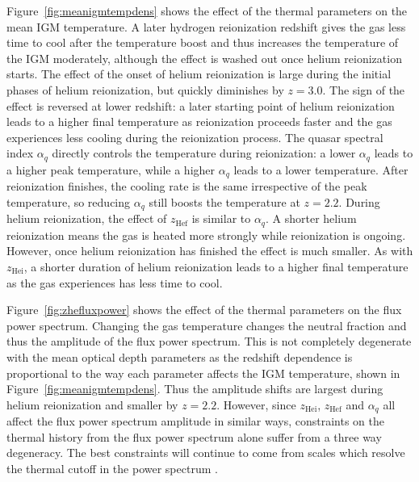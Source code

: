 \documentclass[a4paper,11pt]{article}
\begin{document}
Figure~\ref{fig:meanigmtempdens} shows the effect of the thermal parameters on the mean IGM temperature.
A later hydrogen reionization redshift gives the gas less time to cool after the temperature boost and thus increases the temperature of the IGM moderately, although the effect is washed out once helium reionization starts. The effect of the onset of helium reionization is large during the initial phases of helium reionization, but quickly diminishes by $z=3.0$. The sign of the effect is reversed at lower redshift: a later starting point of helium reionization leads to a higher final temperature as reionization proceeds faster and the gas experiences less cooling during the reionization process. The quasar spectral index $\alpha_q$ directly controls the temperature during reionization: a lower $\alpha_q$ leads to a higher peak temperature, while a higher $\alpha_q$ leads to a lower temperature. After reionization finishes, the cooling rate is the same irrespective of the peak temperature, so reducing $\alpha_q$ still boosts the temperature at $z=2.2$. During helium reionization, the effect of  $z_\mathrm{Hef}$ is similar to $\alpha_q$. A shorter helium reionization means the gas is heated more strongly while reionization is ongoing. However, once helium reionization has finished the effect is much smaller. As with $z_\mathrm{Hei}$, a shorter duration of helium reionization leads to a higher final temperature as the gas experiences has less time to cool.

Figure~\ref{fig:zhefluxpower} shows the effect of the thermal parameters on the flux power spectrum. Changing the gas temperature changes the neutral fraction and thus the amplitude of the flux power spectrum. This is not completely degenerate with the mean optical depth parameters as the redshift dependence is proportional to the way each parameter affects the IGM temperature, shown in Figure~\ref{fig:meanigmtempdens}. Thus the amplitude shifts are largest during helium reionization and smaller by $z=2.2$. However, since $z_\mathrm{Hei}$, $z_\mathrm{Hef}$ and $\alpha_q$ all affect the flux power spectrum amplitude in similar ways, constraints on the thermal history from the flux power spectrum alone suffer from a three way degeneracy. The best constraints will continue to come from scales which resolve the thermal cutoff in the power spectrum \cite{Gaikwad:2021}.
\end{document}
